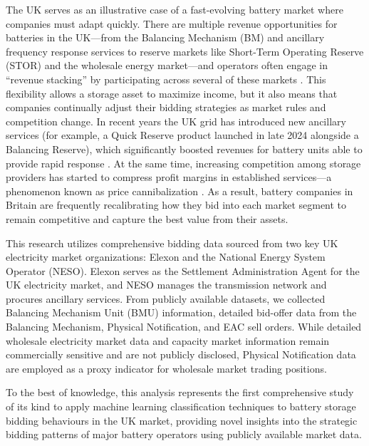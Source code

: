 \documentclass[12pt,a4paper]{article}
\begin{document}
The UK serves as an illustrative case of a fast-evolving battery market where companies must adapt quickly. There are multiple revenue opportunities for batteries in the UK---from the Balancing Mechanism (BM) and ancillary frequency response services to reserve markets like Short-Term Operating Reserve (STOR) and the wholesale energy market---and operators often engage in ``revenue stacking'' by participating across several of these markets \cite{bush2024}. This flexibility allows a storage asset to maximize income, but it also means that companies continually adjust their bidding strategies as market rules and competition change. In recent years the UK grid has introduced new ancillary services (for example, a Quick Reserve product launched in late 2024 alongside a Balancing Reserve), which significantly boosted revenues for battery units able to provide rapid response \cite{jennings2025a}. At the same time, increasing competition among storage providers has started to compress profit margins in established services---a phenomenon known as price cannibalization \cite{jennings2025b}. As a result, battery companies in Britain are frequently recalibrating how they bid into each market segment to remain competitive and capture the best value from their assets.

This research utilizes comprehensive bidding data sourced from two key UK electricity market organizations: Elexon and the National Energy System Operator (NESO). Elexon serves as the Settlement Administration Agent for the UK electricity market, and NESO manages the transmission network and procures ancillary services. From publicly available datasets, we collected Balancing Mechanism Unit (BMU) information, detailed bid-offer data from the Balancing Mechanism, Physical Notification, and EAC sell orders. While detailed wholesale electricity market data and capacity market information remain commercially sensitive and are not publicly disclosed, Physical Notification data are employed as a proxy indicator for wholesale market trading positions.

To the best of knowledge, this analysis represents the first comprehensive study of its kind to apply machine learning classification techniques to battery storage bidding behaviours in the UK market, providing novel insights into the strategic bidding patterns of major battery operators using publicly available market data.
\end{document}
